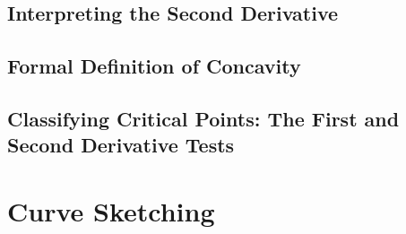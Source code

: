 \subsection{Interpreting the Second Derivative}
\subsection{Formal Definition of Concavity}
\subsection{Classifying Critical Points: The First and Second Derivative Tests}
\section{Curve Sketching}